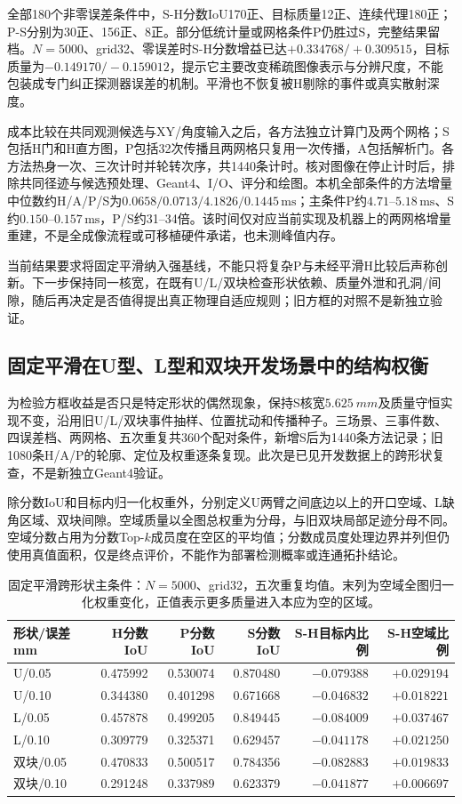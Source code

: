 \documentclass[UTF8,fontset=none,zihao=-4,a4paper]{ctexart}
\begin{document}
全部180个非零误差条件中，S-H分数IoU170正、目标质量12正、连续代理180正；P-S分别为30正、156正、8正。部分低统计量或网格条件P仍胜过S，完整结果留档。$N=5000$、grid32、零误差时S-H分数增益已达$+0.334768/+0.309515$，目标质量为$-0.149170/-0.159012$，提示它主要改变稀疏图像表示与分辨尺度，不能包装成专门纠正探测器误差的机制。平滑也不恢复被H剔除的事件或真实散射深度。

成本比较在共同观测候选与XY/角度输入之后，各方法独立计算门及两个网格；S包括H门和H直方图，P包括32次传播且两网格只复用一次传播，A包括解析门。各方法热身一次、三次计时并轮转次序，共1440条计时。核对图像在停止计时后，排除共同径迹与候选预处理、Geant4、I/O、评分和绘图。本机全部条件的方法增量中位数约H/A/P/S为$0.0658/0.0713/4.1826/0.1445\,\mathrm{ms}$；主条件P约$4.71$--$5.18\,\mathrm{ms}$、S约$0.150$--$0.157\,\mathrm{ms}$，P/S约31--34倍。该时间仅对应当前实现及机器上的两网格增量重建，不是全成像流程或可移植硬件承诺，也未测峰值内存。

当前结果要求将固定平滑纳入强基线，不能只将复杂P与未经平滑H比较后声称创新。下一步保持同一核宽，在既有U/L/双块检查形状依赖、质量外泄和孔洞/间隙，随后再决定是否值得提出真正物理自适应规则；旧方框的对照不是新独立验证。

\subsection{固定平滑在U型、L型和双块开发场景中的结构权衡}
为检验方框收益是否只是特定形状的偶然现象，保持S核宽$\SI{5.625}{mm}$及质量守恒实现不变，沿用旧U/L/双块事件抽样、位置扰动和传播种子。三场景、三事件数、四误差档、两网格、五次重复共360个配对条件，新增S后为1440条方法记录；旧1080条H/A/P的轮廓、定位及权重逐条复现。此次是已见开发数据上的跨形状复查，不是新独立Geant4验证。

除分数IoU和目标内归一化权重外，分别定义U两臂之间底边以上的开口空域、L缺角区域、双块间隙。空域质量以全图总权重为分母，与旧双块局部足迹分母不同。空域分数占用为分数Top-$k$成员度在空区的平均值；分数成员度处理边界并列但仍使用真值面积，仅是终点评价，不能作为部署检测概率或连通拓扑结论。

\begin{table}[H]
\centering
\caption{固定平滑跨形状主条件：$N=5000$、grid32，五次重复均值。末列为空域全图归一化权重变化，正值表示更多质量进入本应为空的区域。}
\label{tab:shape-smoothing-control}
\small
\begin{tabular}{lrrrrr}
\toprule
形状/误差mm & H分数IoU & P分数IoU & S分数IoU & S-H目标内比例 & S-H空域比例\\
\midrule
U/0.05 & 0.475992 & 0.530074 & 0.870480 & $-0.079388$ & $+0.029194$\\
U/0.10 & 0.344380 & 0.401298 & 0.671668 & $-0.046832$ & $+0.018221$\\
L/0.05 & 0.457878 & 0.499205 & 0.849445 & $-0.084009$ & $+0.037467$\\
L/0.10 & 0.309779 & 0.325371 & 0.629457 & $-0.041178$ & $+0.021250$\\
双块/0.05 & 0.470833 & 0.500517 & 0.784356 & $-0.082883$ & $+0.019833$\\
双块/0.10 & 0.291248 & 0.337989 & 0.623379 & $-0.041877$ & $+0.006697$\\
\bottomrule
\end{tabular}
\end{table}
\end{document}
